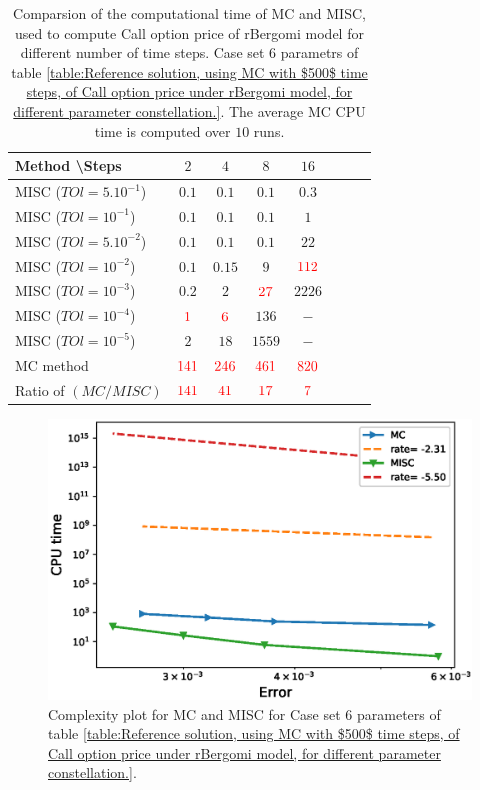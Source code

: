 \documentclass[11pt]{article}
\begin{document}
\begin{table}[h!]
	\centering
	\begin{tabular}{l*{6}{c}r}
		Method \textbackslash  Steps            & $2$ & $4$ & $8$ & $16$ &   \\
		\hline
		MISC ($TOl=5.10^{-1}$)  & $0.1$ & $0.1$ & $0.1$ & $0.3$  \\
		MISC ($TOl=10^{-1}$)  & $0.1$ & $0.1$ & $0.1$ & $1$ \\
		MISC ($TOl=5.10^{-2}$)  & $0.1$ & $0.1$ & $0.1$ & $22$  \\
		MISC ($TOl=10^{-2}$)  & $0.1$ & $0.15$ & $9$ & $\red{112}$ \\
		MISC ($TOl=10^{-3}$)  & $0.2$ & $2$ & $\red{27}$ & $2226$ \\
		MISC ($TOl=10^{-4}$)  & $\red{1}$ & $\red{6}$ & $136$ & $-$\\
		MISC ($TOl=10^{-5}$)  & $2$ & $18$ & $1559$ & $-$
		\\
		\hline
		MC method   & $ \red{141}
		
		$  & $  \red{246}$  & $  \red{461}$ & $ \red{820}
		$  \\	
		\hline
		Ratio of $\left(MC/MISC \right)$ & $ \red{141}
		
		$  & $  \red{
			41
		}$  & $  \red{    17
		}$ & $ \red{ 7}
		$  \\	
%		
		\hline
	\end{tabular}
	\caption{Comparsion of the computational time of  MC and MISC, used to compute Call option price of rBergomi model for different number of time steps. Case set $6$ parametrs of table \ref{table:Reference solution, using MC with $500$ time steps, of Call option price under rBergomi model, for different parameter constellation.}. The average  MC CPU time is computed over $10$ runs. }
	\label{Comparsion of the computational time of  MC and MISC, used to compute Call option price of rBergomi model for different number of time steps. Case set6}
\end{table}




	\begin{figure}[h!]
	\centering
	\includegraphics[width=0.7\linewidth]{./figures/rBergomi_Complexity_rates/set6/error_vs_time_set6}
	
	\caption{Complexity plot for   MC and MISC for Case set $6$ parameters of table \ref{table:Reference solution, using MC with $500$ time steps, of Call option price under rBergomi model, for different parameter constellation.}.}
	\label{fig:Complexity plot for MC and MISC for Case set $6$ parameters}
\end{figure}
\FloatBarrier
\end{document}
